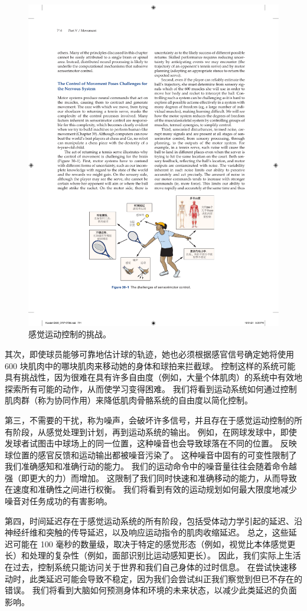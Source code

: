 \begin{figure}[htbp]
	\centering
	\includegraphics[width=0.75\linewidth]{chap30/fig_30_1}
	\caption{感觉运动控制的挑战。}
	\label{fig:30_1}
\end{figure}


其次，即使球员能够可靠地估计球的轨迹，她也必须根据感官信号确定她将使用 600 块肌肉中的哪块肌肉来移动她的身体和球拍来拦截球。
控制这样的系统可能具有挑战性，因为很难在具有许多自由度（例如，大量个体肌肉）的系统中有效地探索所有可能的动作，从而使学习变得困难。
我们将看到运动系统如何通过控制肌肉群（称为协同作用）来降低肌肉骨骼系统的自由度以简化控制。


第三，不需要的干扰，称为噪声，会破坏许多信号，并且存在于感觉运动控制的所有阶段，从感觉处理到计划，再到运动系统的输出。
例如，在网球发球中，即使发球者试图击中球场上的同一位置，这种噪音也会导致球落在不同的位置。
反映球位置的感官反馈和运动输出都被噪音污染了。
这种噪音中固有的可变性限制了我们准确感知和准确行动的能力。
我们的运动命令中的噪音量往往会随着命令越强（即更大的力）而增加。
这限制了我们同时快速和准确移动的能力，从而导致在速度和准确性之间进行权衡。
我们将看到有效的运动规划如何最大限度地减少噪音对任务成功的有害影响。


第四，时间延迟存在于感觉运动系统的所有阶段，包括受体动力学引起的延迟、沿神经纤维和突触的传导延迟，以及响应运动指令的肌肉收缩延迟。
总之，这些延迟可能在 100 毫秒的数量级，取决于特定的感觉形态（例如，视觉比本体感觉更长）和处理的复杂性（例如，面部识别比运动感知更长）。
因此，我们实际上生活在过去，控制系统只能访问关于世界和我们自己身体的过时信息。
在尝试快速移动时，此类延迟可能会导致不稳定，因为我们会尝试纠正我们察觉到但已不存在的错误。
我们将看到大脑如何预测身体和环境的未来状态，以减少此类延迟的负面影响。


